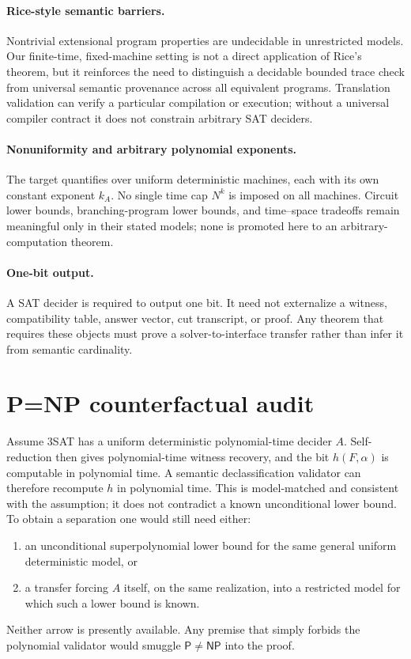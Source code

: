 \documentclass[11pt]{article}
\begin{document}
\paragraph{Rice-style semantic barriers.}
Nontrivial extensional program properties are undecidable in unrestricted
models.  Our finite-time, fixed-machine setting is not a direct application of
Rice's theorem, but it reinforces the need to distinguish a decidable bounded
trace check from universal semantic provenance across all equivalent programs.
Translation validation can verify a particular compilation or execution;
without a universal compiler contract it does not constrain arbitrary SAT
deciders.

\paragraph{Nonuniformity and arbitrary polynomial exponents.}
The target quantifies over uniform deterministic machines, each with its own
constant exponent $k_A$.  No single time cap $N^k$ is imposed on all machines.
Circuit lower bounds, branching-program lower bounds, and time--space
tradeoffs remain meaningful only in their stated models; none is promoted here
to an arbitrary-computation theorem.

\paragraph{One-bit output.}
A SAT decider is required to output one bit.  It need not externalize a witness,
compatibility table, answer vector, cut transcript, or proof.  Any theorem that
requires these objects must prove a solver-to-interface transfer rather than
infer it from semantic cardinality.

\section*{P=NP counterfactual audit}
Assume 3SAT has a uniform deterministic polynomial-time decider $A$.
Self-reduction then gives polynomial-time witness recovery, and the bit
$h(F,\alpha)$ is computable in polynomial time.  A semantic declassification
validator can therefore recompute $h$ in polynomial time.  This is
model-matched and consistent with the assumption; it does not contradict a
known unconditional lower bound.  To obtain a separation one would still need
either:
\begin{enumerate}
\item an unconditional superpolynomial lower bound for the same general
uniform deterministic model, or
\item a transfer forcing $A$ itself, on the same realization, into a restricted
model for which such a lower bound is known.
\end{enumerate}
Neither arrow is presently available.  Any premise that simply forbids the
polynomial validator would smuggle $\mathsf P\ne\mathsf{NP}$ into the proof.
\end{document}
